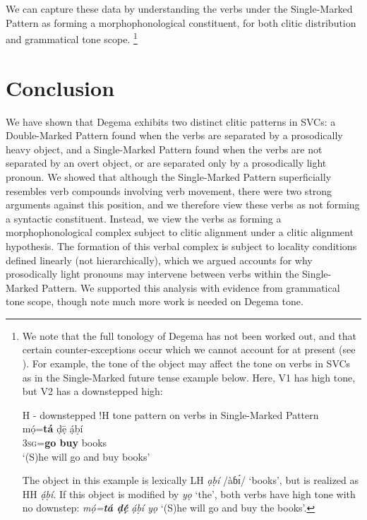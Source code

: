 \documentclass[output=paper]{langsci/langscibook}
\begin{document}
We can capture these data by understanding the verbs under the Single-Marked Pattern as forming a morphophonological constituent, for both clitic distribution and grammatical tone scope.%
\footnote{We 
  note that the full tonology of Degema has not been worked out, and that certain counter-exceptions occur which we cannot account for at present (see \citealt{Rolle2015}). For example, the tone of the object may affect the tone on verbs in SVCs as in the Single-Marked future tense example below. Here, V1 has high tone, but V2 has a downstepped high:

  \ea
  H - downstepped !H tone pattern on verbs in Single-Marked Pattern\\
  \gll \textup{m\'ọ=\textbf{tá}    {ḍ\=ẹ}   \'ạḅí}\\
  3\textsc{sg}=\textbf{go  buy}   books\\
  \glt ‘(S)he will go and buy books’ 
  \z 


  The object in this example is lexically LH \textit{ạḅí} /àɓ\'ɪ/ ‘books’, but is realized as HH \textit{ạ́ḅí}. If this object is modified by \textit{yọ} ‘the’, both verbs have high tone with no downstep: \textit{m\'ọ=}\textbf{\textit{tá ḍ\'ẹ}} \textit{\'ạḅí yọ} ‘(S)he will go and buy the books’. 
}

\section{Conclusion}

We have shown that Degema exhibits two distinct clitic patterns in SVCs: a Double-Marked Pattern found when the verbs are separated by a prosodically heavy object, and a Single-Marked Pattern found when the verbs are not separated by an overt object, or are separated only by a prosodically light pronoun. We showed that although the Single-Marked Pattern superficially resembles verb compounds involving verb movement, there were two strong arguments against this position, and we therefore view these verbs as not forming a syntactic constituent. Instead, we view the verbs as forming a morphophonological complex subject to clitic alignment under a clitic alignment hypothesis. The formation of this verbal complex is subject to locality conditions defined linearly (not hierarchically), which we argued accounts for why prosodically light pronouns may intervene between verbs within the Single-Marked Pattern. We supported this analysis with evidence from grammatical tone scope, though note much more work is needed on Degema tone.
\end{document}
